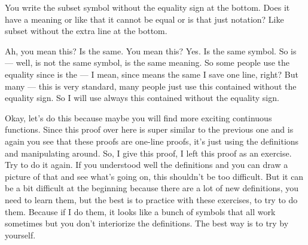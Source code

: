 \begin{student-interaction}
You write the subset symbol without the equality sign at the bottom. Does it have a meaning or like that it cannot be equal or is that just notation? Like subset without the extra line at the bottom.
\end{student-interaction}

\begin{spoken-clean}[00:13:12 - 00:14:00]
Ah, you mean this?  Is the same. You mean this? Yes. Is the same symbol. So is --- well, is not the same symbol, is the same meaning. So some people use the equality since is the --- I mean, since means the same I save one line, right? But many --- this is very standard, many people just use this contained without the equality sign. So I will use always this contained without the equality sign.
\end{spoken-clean}


\begin{spoken-clean}[00:14:00 - 00:15:30]
Okay, let's do this because maybe you will find more exciting continuous functions. Since this proof over here is super similar to the previous one and is again you see that these proofs are one-line proofs, it's just using the definitions and manipulating around. So, I give this proof, I left this proof as an exercise. Try to do it again. If you understood well the definitions and you can draw a picture of that and see what's going on, this shouldn't be too difficult. But it can be a bit difficult at the beginning because there are a lot of new definitions, you need to learn them, but the best is to practice with these exercises, to try to do them. Because if I do them, it looks like a bunch of symbols that all work sometimes but you don't interiorize the definitions. The best way is to try by yourself.
\end{spoken-clean}

